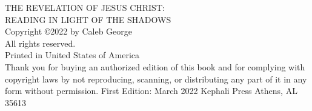 \pagestyle{empty}
\frontmatter


\titleGM

\clearpage

\begin{vplace}[2]
\noindent
THE REVELATION OF JESUS CHRIST: \\READING IN LIGHT OF THE SHADOWS\\
\newline
Copyright \copyright 2022 by Caleb George\\
All rights reserved.\\
\newline
Printed in United States of America\\
\newline
Thank you for buying an authorized edition of this book and for complying with copyright laws by not reproducing, scanning, or distributing any part of it in any form without permission.
\newline
\newline
First Edition: March 2022
\newline
\newline
Kephali Press
\newline
Athens, AL 35613
\end{vplace}

\clearpage
\clearpage

\dedication
\clearpage

